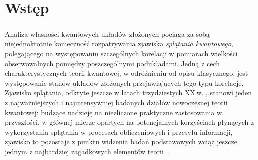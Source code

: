 
\chapter{Wstęp}
\label{chp:intro}

\paragraph{}
\label{par:intro:01}
Analiza własności kwantowych układów złożonych pociąga za sobą niejednokrotnie
konieczność rozpatrywania zjawiska
 \emph{splątania kwantowego},
polegającego na występowaniu szczególnych korelacji w pomiarach 
wielkości obserwowalnych pomiędzy poszczególnymi podukładami. 
Jedną z cech charakterystycznych teorii kwantowej,
w odróżnieniu od opisu klasycznego,
jest występowanie stanów układów złożonych przejawiających tego typu korelacje.
Zjawisko splątania, odkryte jeszcze w latach trzydziestych XX\,w.
\cite{einstein1935can,schrodinger1935gegenwartige},
stanowi jeden z najważniejszych i najintensywniej badanych działów nowoczesnej
teorii kwantowej:
budzące nadzieję na niezliczone praktyczne zastosowania w przyszłości,
w głównej mierze opartych na potencjalnych korzyściach płynących
z wykorzystania splątania w procesach obliczeniowych i przesyłu informacji,
zjawisko to pozostaje z punktu widzenia badań podstawowych wciąż jeszcze jednym
z najbardziej zagadkowych elementów
\mbox{teorii \cite{horodecki2009quantum}}.

